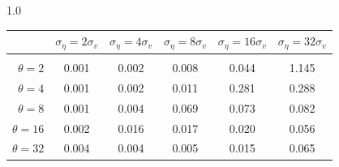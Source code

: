 \documentclass[12pt]{article}
\begin{document}
\begin{table}[h!]
\vspace{10pt}
\begin{subtable}{1.0\textwidth}
    \centering
\begin{tabular}{rccccc}
\hline  
            & \multicolumn{1}{l}{$\sigma_{\eta} =2\sigma_{v}$} & \multicolumn{1}{l}{$\sigma_{\eta} =4\sigma_{v}$} & \multicolumn{1}{l}{$\sigma_{\eta} =8\sigma_{v}$} & \multicolumn{1}{l}{$\sigma_{\eta} =16\sigma_{v}$} & \multicolumn{1}{l}{$\sigma_{\eta} =32\sigma_{v}$} \\ \hline  \vspace{-3mm} \\        
$\theta=2$  & 0.001                                             & 0.002                                             & 0.008                                             & 0.044                                              & 1.145                                              \\ \hline
$\theta=4$  & 0.001                                             & 0.002                                             & 0.011                                             & 0.281                                              & 0.288                                              \\ \hline
$\theta=8$  & 0.001                                             & 0.004                                             & 0.069                                             & 0.073                                              & 0.082                                              \\ \hline
$\theta=16$ & 0.002                                             & 0.016                                             & 0.017                                             & 0.020                                              & 0.056                                              \\ \hline
$\theta=32$ & 0.004                                             & 0.004                                             & 0.005                                             & 0.015                                              & 0.065                                              \\ \hline
\end{tabular}
\end{subtable}


\end{table}
\end{document}
